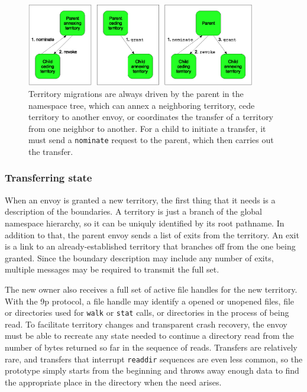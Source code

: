 \begin{figure}[tp]
\centering
\includegraphics[width=100mm]{figures/grant-topdown}
\caption[Types of territory migrations]{Territory migrations are always driven by the parent in the namespace tree, which can annex a neighboring territory, cede territory to another envoy, or coordinates the transfer of a territory from one neighbor to another. For a child to initiate a transfer, it must send a \texttt{nominate} request to the parent, which then carries out the transfer.}
\label{fig:grant-topdown}
\end{figure}

\subsubsection{Transferring state}\label{sec:migrating-state}

When an envoy is granted a new territory, the first thing that it needs is a description of the boundaries. A territory is just a branch of the global namespace hierarchy, so it can be uniquly identified by its root pathname. In addition to that, the parent envoy sends a list of exits from the territory. An exit is a link to an already-established territory that branches off from the one being granted. Since the boundary description may include any number of exits, multiple messages may be required to transmit the full set.

The new owner also receives a full set of active file handles for the new territory. With the 9p protocol, a file handle may identify a opened or unopened files, file or directories used for \texttt{walk} or \texttt{stat} calls, or directories in the process of being read. To facilitate territory changes and transparent crash recovery, the envoy must be able to recreate any state needed to continue a directory read from the number of bytes returned so far in the sequence of reads. Transfers are relatively rare, and transfers that interrupt \texttt{readdir} sequences are even less common, so the prototype simply starts from the beginning and throws away enough data to find the appropriate place in the directory when the need arises.

